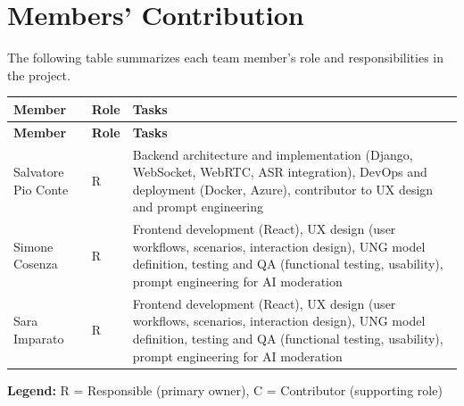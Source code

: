 \chapter{Members' Contribution}

The following table summarizes each team member's role and responsibilities in the project.

\begin{longtable}{|p{4cm}|p{2cm}|p{8cm}|}
    \hline
    \textbf{Member} & \textbf{Role} & \textbf{Tasks} \\
    \hline
    \endfirsthead

    \hline
    \textbf{Member} & \textbf{Role} & \textbf{Tasks} \\
    \hline
    \endhead

    Salvatore Pio Conte &
    R &
    Backend architecture and implementation (Django, WebSocket, WebRTC, ASR integration), DevOps and deployment (Docker, Azure), contributor to UX design and prompt engineering
    \\
    \hline

    Simone Cosenza &
    R &
    Frontend development (React), UX design (user workflows, scenarios, interaction design), UNG model definition, testing and QA (functional testing, usability), prompt engineering for AI moderation
    \\
    \hline

    Sara Imparato &
    R &
    Frontend development (React), UX design (user workflows, scenarios, interaction design), UNG model definition, testing and QA (functional testing, usability), prompt engineering for AI moderation
    \\
    \hline

\end{longtable}

\textbf{Legend:} R = Responsible (primary owner), C = Contributor (supporting role)
